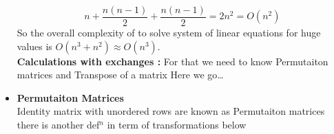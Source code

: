 \documentclass[a4paper,11pt]{article}
\numberwithin{equation}{section}
\begin{document}
\begin{itemize}
    \begin{equation}
        n+\frac{n(n-1)}{2}+\frac{n(n-1)}{2}=2n^2=O(n^2)
    \end{equation}
So the overall complexity of to solve system of linear equations for huge values is $O(n^3+n^2) \approx O(n^3)$.\\

\textbf{Calculations with exchanges : }For that we need to know Permutaiton matrices and Transpose of a matrix Here we go\dots 


\item \textbf{Permutaiton Matrices}\\
 
    Identity matrix with unordered rows are known as Permutaiton matrices there is another def$^n$ in term of transformations below\\


\end{itemize}
\end{document}
